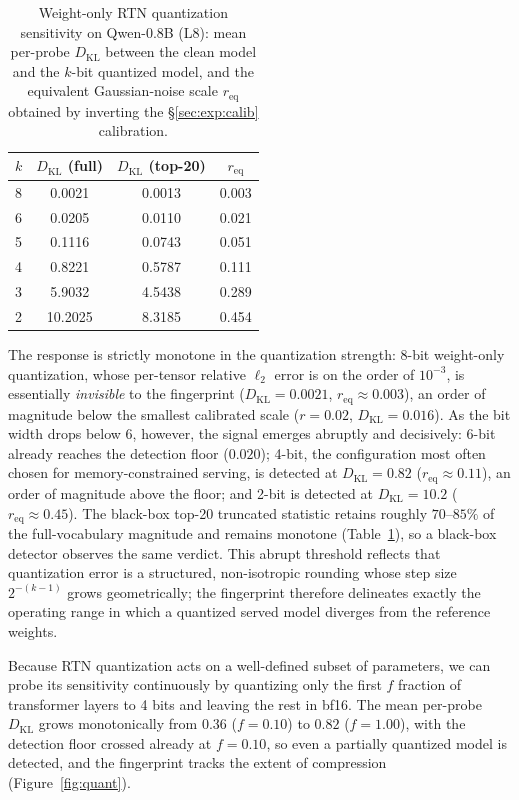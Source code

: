 \documentclass[11pt]{article}
\theoremstyle{definition}
\begin{document}
\begin{table}[t]
\centering
\small
\caption{Weight-only RTN quantization sensitivity on Qwen-0.8B (L8): mean
per-probe $D_{\mathrm{KL}}$ between the clean model and the $k$-bit quantized
model, and the equivalent Gaussian-noise scale $r_{\mathrm{eq}}$ obtained by
inverting the \S\ref{sec:exp:calib} calibration.}
\label{tab:quant}
\begin{tabular}{lccc}
\toprule
$k$ & $D_{\mathrm{KL}}$ (full) & $D_{\mathrm{KL}}$ (top-20) & $r_{\mathrm{eq}}$ \\
\midrule
8 & 0.0021 & 0.0013 & 0.003 \\
6 & 0.0205 & 0.0110 & 0.021 \\
5 & 0.1116 & 0.0743 & 0.051 \\
4 & 0.8221 & 0.5787 & 0.111 \\
3 & 5.9032 & 4.5438 & 0.289 \\
2 & 10.2025 & 8.3185 & 0.454 \\
\bottomrule
\end{tabular}
\end{table}

The response is strictly monotone in the quantization strength: 8-bit
weight-only quantization, whose per-tensor relative $\ell_2$ error is on the
order of $10^{-3}$, is essentially \emph{invisible} to the fingerprint
($D_{\mathrm{KL}} = 0.0021$, $r_{\mathrm{eq}} \approx 0.003$), an order of
magnitude below the smallest calibrated scale ($r=0.02$,
$D_{\mathrm{KL}}=0.016$). As the bit width drops below $6$, however, the signal
emerges abruptly and decisively: 6-bit already reaches the detection floor
($0.020$); 4-bit, the configuration most often chosen for memory-constrained
serving, is detected at $D_{\mathrm{KL}}=0.82$ ($r_{\mathrm{eq}} \approx 0.11$),
an order of magnitude above the floor; and 2-bit is detected at
$D_{\mathrm{KL}}=10.2$ ($r_{\mathrm{eq}} \approx 0.45$). The black-box top-20
truncated statistic retains roughly $70$--$85\%$ of the full-vocabulary
magnitude and remains monotone (Table~\ref{tab:quant}), so a black-box detector
observes the same verdict. This abrupt threshold reflects that quantization
error is a structured, non-isotropic rounding whose step
size $2^{-(k-1)}$ grows geometrically; the fingerprint therefore delineates
exactly the operating range in which a quantized served model diverges from the
reference weights.

Because RTN quantization acts on a well-defined subset of parameters, we can
probe its sensitivity continuously by quantizing only the first $f$ fraction of
transformer layers to 4 bits and leaving the rest in bf16. The mean per-probe
$D_{\mathrm{KL}}$ grows monotonically from $0.36$ ($f=0.10$) to $0.82$
($f=1.00$), with the detection floor crossed already at $f=0.10$, so even a
partially quantized model is detected, and the fingerprint tracks the extent of
compression (Figure~\ref{fig:quant}).
\end{document}
